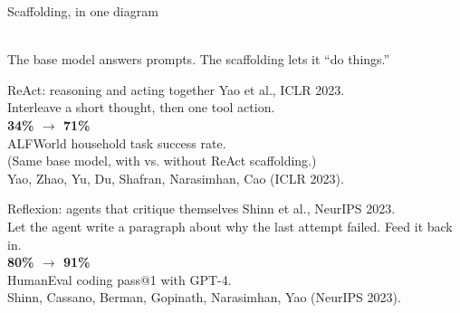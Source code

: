 \documentclass[aspectratio=169, 12pt, xcolor={dvipsnames,table}]{beamer}
\newcommand{\bignum}[1]{{\fontsize{60}{66}\selectfont\bfseries\color{accent}#1}}
\begin{document}
\begin{frame}{Scaffolding, in one diagram}
  \vfill
  \centering
  \\[1em]
  {\color{mute}\small The base model answers prompts. The scaffolding lets it ``do things.''}
  \vfill
\end{frame}

\begin{frame}{ReAct: reasoning and acting together}
  \vfill
  \centering
  {\large Yao et al., {\color{accent}ICLR 2023}.}\\[0.8em]
  {\Large Interleave a short thought, then one tool action.}\\[1.2em]
  \bignum{34\% $\to$ 71\%}\\[0.4em]
  {\large ALFWorld household task success rate.}\\[0.6em]
  {\color{mute}(Same base model, with vs. without ReAct scaffolding.)}\\[1em]
  {\scriptsize\color{mute}Yao, Zhao, Yu, Du, Shafran, Narasimhan, Cao (ICLR 2023).}
  \vfill
\end{frame}

\begin{frame}{Reflexion: agents that critique themselves}
  \vfill
  \centering
  {\large Shinn et al., {\color{accent}NeurIPS 2023}.}\\[0.8em]
  {\Large Let the agent write a paragraph about why the last attempt failed. Feed it back in.}\\[1.2em]
  \bignum{80\% $\to$ 91\%}\\[0.4em]
  {\large HumanEval coding pass@1 with GPT-4.}\\[1em]
  {\scriptsize\color{mute}Shinn, Cassano, Berman, Gopinath, Narasimhan, Yao (NeurIPS 2023).}
  \vfill
\end{frame}
\end{document}

